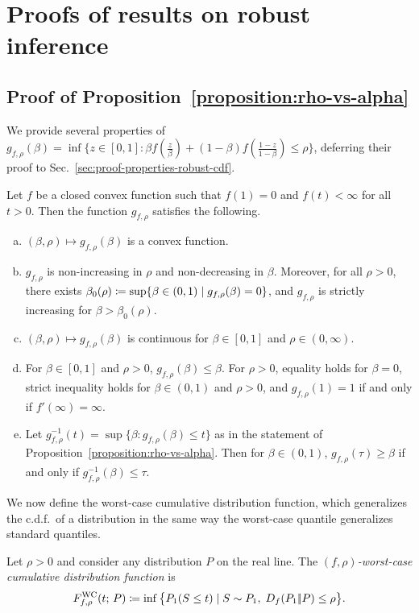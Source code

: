 \section{Proofs of results on robust inference}

\subsection{Proof of Proposition~\ref{proposition:rho-vs-alpha}}
\label{sec:proof-rho-vs-alpha}

We provide several properties of $g_{f,\rho}(\beta) = \inf\{z \in [0, 1] :
\beta f(\frac{z}{\beta}) + (1 - \beta) f(\frac{1-z}{1 - \beta}) \le \rho\}$,
deferring their proof to Sec.~\ref{sec:proof-properties-robust-cdf}.
\begin{lemma}
  \label{lemma:properties-robust-cdf}
  Let $f$ be a closed convex function such that $f(1) = 0$ and $f(t) < \infty$ for all $t > 0$. Then the function
  $g_{f,\rho}$ satisfies the following.
  \begin{enumerate}[(a)]
  \item $(\beta, \rho) \mapsto g_{f,\rho}(\beta)$ is a convex
    function.
  \item \label{item:gf-rho-monotonicity}
    $g_{f,\rho}$ is non-increasing in $\rho$ and non-decreasing in
    $\beta$. Moreover, for all $\rho >0$, there exists $\beta_0(\rho) \coloneqq
    \sup \{\beta \in (0,1) \mid g_{f,\rho}(\beta) = 0 \}$, and
    $g_{f,\rho}$ is strictly increasing for $\beta > \beta_0(\rho)$.
  \item \label{item:gf-rho-continuity}
    $(\beta, \rho) \mapsto g_{f,\rho}(\beta)$ is continuous for $\beta
    \in [0, 1]$ and $\rho \in (0,\infty)$.
  \item For $\beta \in [0,1]$ and $\rho > 0 $, $g_{f,\rho}(\beta) \le
    \beta$.  For $\rho > 0$, equality holds for $\beta = 0$,
    strict inequality holds for $\beta \in (0,1)$ and $\rho > 0$,
   and $g_{f,\rho}(1)=1$ if and only if $f'(\infty) = \infty$.
  \item Let $g_{f,\rho}^{-1}(t) = \sup\{\beta : g_{f,\rho}(\beta) \le t\}$
    as in the statement of Proposition~\ref{proposition:rho-vs-alpha}.
    Then for $\beta \in (0, 1)$, $g_{f,\rho}(\tau) \ge \beta$ if and only
    if $g_{f,\rho}^{-1}(\beta) \le \tau$.
  \end{enumerate}
\end{lemma}

We now define the worst-case cumulative distribution function, which
generalizes the c.d.f.\ of a distribution in the same way the worst-case
quantile generalizes standard quantiles.
\begin{definition}
  Let $\rho > 0$ and consider any distribution $P$ on the real line.
  The \emph{$(f,\rho)$-worst-case cumulative distribution function} is
  \begin{align}
    \label{eqn:robust-f-div-cdf-def}
    F^{\textup{WC}}_{f,\rho}(t; \, P) \coloneqq 
    \inf \big\{ P_1(S \le t) \mid S \sim P_1, \; D_{f}({P_1} |\!| {P})
    \le \rho \big\}.
  \end{align}
\end{definition}

